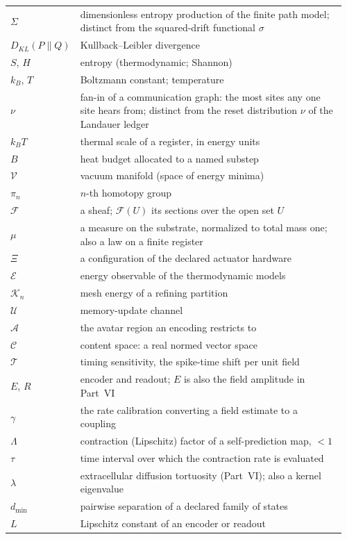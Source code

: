 \documentclass[11pt]{article}
\begin{document}
\begin{center}
\begin{longtable}{@{}p{0.16\linewidth}p{0.80\linewidth}@{}}
$\Sigma$ & dimensionless entropy production of the finite path model; distinct from the squared-drift functional $\sigma$ \\
$D_{KL}(P\|Q)$ & Kullback--Leibler divergence \\
$S$, $H$ & entropy (thermodynamic; Shannon) \\
$k_B$, $T$ & Boltzmann constant; temperature \\
$\nu$ & fan-in of a communication graph: the most sites any one site hears from; distinct from the reset distribution $\nu$ of the Landauer ledger \\
$k_BT$ & thermal scale of a register, in energy units \\
$B$ & heat budget allocated to a named substep \\
$\mathcal{V}$ & vacuum manifold (space of energy minima) \\
$\pi_n$ & $n$-th homotopy group \\
$\mathcal{F}$ & a sheaf; $\mathcal{F}(U)$ its sections over the open set $U$ \\
$\mu$ & a measure on the substrate, normalized to total mass one; also a law on a finite register \\
$\Xi$ & a configuration of the declared actuator hardware \\
$\mathcal{E}$ & energy observable of the thermodynamic models \\
$\mathcal{K}_n$ & mesh energy of a refining partition \\
$\mathcal{U}$ & memory-update channel \\
$\mathcal{A}$ & the avatar region an encoding restricts to \\
$\mathcal{C}$ & content space: a real normed vector space \\
$\mathcal{T}$ & timing sensitivity, the spike-time shift per unit field \\
$E$, $R$ & encoder and readout; $E$ is also the field amplitude in Part~VI \\
$\gamma$ & the rate calibration converting a field estimate to a coupling \\
$\Lambda$ & contraction (Lipschitz) factor of a self-prediction map, $<1$ \\
$\tau$ & time interval over which the contraction rate is evaluated \\
$\lambda$ & extracellular diffusion tortuosity (Part~VI); also a kernel eigenvalue \\
$d_{\min}$ & pairwise separation of a declared family of states \\
$L$ & Lipschitz constant of an encoder or readout \\
\hline
\end{longtable}
\end{center}
\end{document}
